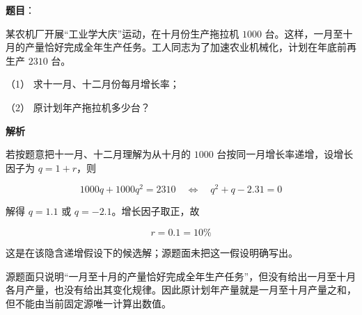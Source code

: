 \begin{answer}

\textbf{题目}：

某农机厂开展“工业学大庆”运动，在十月份生产拖拉机 $1000$ 台。这样，一月至十月的产量恰好完成全年生产任务。工人同志为了加速农业机械化，计划在年底前再生产 $2310$ 台。

（1） 求十一月、十二月份每月增长率；

（2） 原计划年产拖拉机多少台？

\textbf{解析}


若按题意把十一月、十二月理解为从十月的 $1000$ 台按同一月增长率递增，设增长因子为 $q=1+r$，则

\nopagebreak[4]
\[
1000q+1000q^2=2310
\quad\Longleftrightarrow\quad
q^2+q-2.31=0
\]

解得 $q=1.1$ 或 $q=-2.1$。增长因子取正，故

\nopagebreak[4]
\[
r=0.1=10\%
\]

这是在该隐含递增假设下的候选解；源题面未把这一假设明确写出。


源题面只说明“一月至十月的产量恰好完成全年生产任务”，但没有给出一月至十月各月产量，也没有给出其变化规律。因此原计划年产量就是一月至十月产量之和，但不能由当前固定源唯一计算出数值。



\end{answer}
